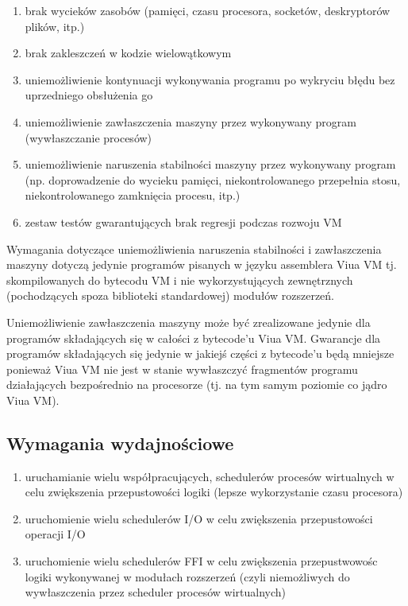 \documentclass[11pt,oneside,a4paper,titlepage,onecolumn]{article}
\begin{document}
\begin{enumerate}
    \item brak wycieków zasobów (pamięci, czasu procesora, socketów, deskryptorów plików, itp.)
    \item brak zakleszczeń w kodzie wielowątkowym
    \item uniemożliwienie kontynuacji wykonywania programu po wykryciu błędu bez uprzedniego obsłużenia go
    \item uniemożliwienie zawłaszczenia maszyny przez wykonywany program (wywłaszczanie procesów)
    \item uniemożliwienie naruszenia stabilności maszyny przez wykonywany program (np. doprowadzenie do
        wycieku pamięci, niekontrolowanego przepełnia stosu, niekontrolowanego zamknięcia procesu, itp.)
    \item zestaw testów gwarantujących brak regresji podczas rozwoju VM
\end{enumerate}

Wymagania dotyczące uniemożliwienia naruszenia stabilności i zawłaszczenia maszyny dotyczą jedynie programów
pisanych w języku assemblera Viua VM tj. skompilowanych do bytecodu VM i nie wykorzystujących zewnętrznych
(pochodzących spoza biblioteki standardowej) modułów rozszerzeń.

Uniemożliwienie zawłaszczenia maszyny może być zrealizowane jedynie dla programów składających się w całości z
bytecode'u Viua VM. Gwarancje dla programów składających się jedynie w jakiejś części z bytecode'u będą
mniejsze ponieważ Viua VM nie jest w stanie wywłaszczyć fragmentów programu działających bezpośrednio na
procesorze (tj. na tym samym poziomie co jądro Viua VM).

\subsection{Wymagania wydajnościowe}

\begin{enumerate}
    \item uruchamianie wielu współpracujących, schedulerów procesów wirtualnych w celu zwiększenia
        przepustowości logiki (lepsze wykorzystanie czasu procesora)
    \item uruchomienie wielu schedulerów I/O w celu zwiększenia przepustowości operacji I/O
    \item uruchomienie wielu schedulerów FFI w celu zwiększenia przepustwowośc logiki wykonywanej w modułach
        rozszerzeń (czyli niemożliwych do wywłaszczenia przez scheduler procesów wirtualnych)
\end{enumerate}
\end{document}
